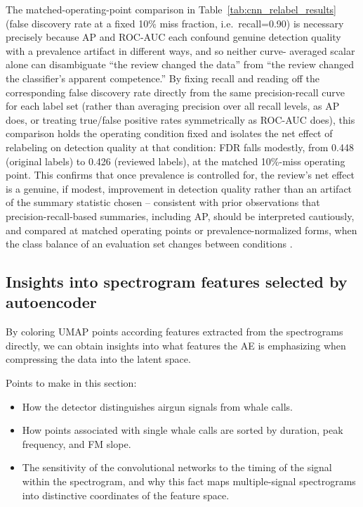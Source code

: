 \documentclass[preprint,NumberedRefs]{JASAnew}
\begin{document}
The matched-operating-point comparison in Table~\ref{tab:cnn_relabel_results}
(false discovery rate at a fixed 10\% miss fraction, i.e.\ recall=0.90) is
necessary precisely because AP and ROC-AUC each confound genuine detection
quality with a prevalence artifact in different ways, and so neither curve-
averaged scalar alone can disambiguate ``the review changed the data'' from
``the review changed the classifier's apparent competence.'' By fixing
recall and reading off the corresponding false discovery rate directly from
the same precision-recall curve for each label set (rather than averaging
precision over all recall levels, as AP does, or treating true/false
positive rates symmetrically as ROC-AUC does), this comparison holds the
operating condition fixed and isolates the net effect of relabeling on
detection quality at that condition: FDR falls modestly, from 0.448
(original labels) to 0.426 (reviewed labels), at the matched 10\%-miss
operating point. This confirms that once prevalence is controlled for, the
review's net effect is a genuine, if modest, improvement in detection
quality rather than an artifact of the summary statistic chosen -- consistent
with prior observations that precision-recall-based summaries, including AP,
should be interpreted cautiously, and compared at matched operating points
or prevalence-normalized forms, when the class balance of an evaluation set
changes between conditions \cite{davis2006relationship,saito2015precision,
he2009learning}.

\subsection{Insights into spectrogram features selected by autoencoder}

By coloring UMAP points according features extracted from the spectrograms directly, we can obtain insights into what features the AE is emphasizing when compressing the data into the latent space.

Points to make in this section:
\begin{itemize}
\item How the detector distinguishes airgun signals from whale calls.
    \item How points associated with single whale calls are sorted by duration, peak frequency, and FM slope.
    \item The sensitivity of the convolutional networks to the timing of the signal within the spectrogram, and why this fact maps multiple-signal spectrograms into distinctive coordinates of the feature space.
\end{itemize}
\end{document}
